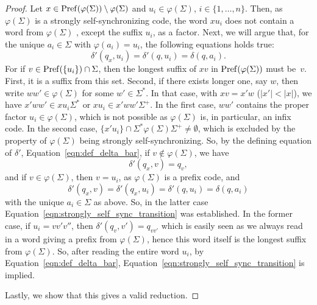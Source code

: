 \begin{proof}
  Let $x \in \operatorname{Pref}(\varphi(\Sigma)) \setminus \varphi(\Sigma)$
  and $u_i \in \varphi(\Sigma)$, $i \in \{1,\ldots,n\}$.
  Then, as $\varphi(\Sigma)$
  is a strongly self-synchronizing code, the word $xu_i$ does not contain
  a word from $\varphi(\Sigma)$ , except the suffix $u_i$,
  as a factor. Next, we will argue that, for the unique $a_i \in \Sigma$
  with $\varphi(a_i) = u_i$, the following equations 
  holds true:
  \begin{equation}\label{eqn:strongly_self_sync_transition}
   \delta'(q_x, u_i) = \delta'(q, u_i) = \delta(q, a_i).
  \end{equation}
  For if $v \in \operatorname{Pref}(\{ u_i \}) \cap \Sigma$, then the longest suffix of $xv$
  in $\operatorname{Pref}(\varphi(\Sigma))$ must be~$v$.
  First, it is a suffix
  from this set.
  Second, if there exists longer one, say $w$,
  then write $ww' \in \varphi(\Sigma)$ for some $w' \in \Sigma^*$.
  In that case, with $xv = x'w$ ($|x'| < |x|$), we have $x'ww' \in xu_i\Sigma^*$
  or $xu_i \in x'ww'\Sigma^+$.
  In the first case, $ww'$ contains the proper factor $u_i \in \varphi(\Sigma)$,
  which is not possible as $\varphi(\Sigma)$ is, in particular, an infix code.
  In the second case, $\{ x'u_i \} \cap \Sigma^* \varphi(\Sigma) \Sigma^+ \ne \emptyset$,
  which is excluded by the property of $\varphi(\Sigma)$ being strongly self-synchronizing.
  So, by the defining equation of $\delta'$, Equation~\eqref{eqn:def_delta_bar},
  if $v \notin \varphi(\Sigma)$, we have
  \[
   \delta'(q_x, v) = q_v,
  \]
  and if $v \in \varphi(\Sigma)$, then $v = u_i$, as $\varphi(\Sigma)$ is a prefix code,
  and
  \[
   \delta'(q_x, v) = \delta'(q_x, u_i) = \delta'(q, u_i) = \delta(q, a_i)
  \]
  with the unique $a_i \in \Sigma$ as above.
  So, in the latter case Equation~\eqref{eqn:strongly_self_sync_transition}
  was established. In the former case,
  if $u_i = vv'v''$, then $\delta'(q_v, v') = q_{vv'}$
  which is easily seen as we always read in a word giving a prefix from $\varphi(\Sigma)$, hence
  this word itself is the longest suffix from $\varphi(\Sigma)$.
  So, after reading the entire word $u_i$, by Equation~\eqref{eqn:def_delta_bar},
  Equation~\eqref{eqn:strongly_self_sync_transition}
  is implied.
  
  
  Lastly, we show that this gives a valid reduction.
  

\end{proof}
